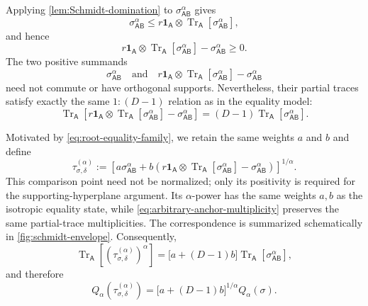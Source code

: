 \documentclass[11pt,reqno]{amsart}
\theoremstyle{definition}
\DeclareMathOperator{\Tr}{Tr}
\newcommand{\I}{\mathbf 1}
\newcommand{\A}{\mathsf{A}}
\newcommand{\B}{\mathsf{B}}
\begin{document}
Applying \cref{lem:Schmidt-domination} to
$\sigma_{\A\B}^{\alpha}$ gives
\begin{equation}\label{eq:root-envelope-explicit}
	\sigma_{\A\B}^{\alpha}
	\leq
	r\I_{\A}\otimes
	\Tr_{\A}[\sigma_{\A\B}^{\alpha}],
\end{equation}
and hence
\begin{equation}\label{eq:root-complement-explicit}
	r\I_{\A}\otimes
	\Tr_{\A}[\sigma_{\A\B}^{\alpha}]
	-
	\sigma_{\A\B}^{\alpha}
	\geq0.
\end{equation}
The two positive summands
\[
\sigma_{\A\B}^{\alpha}
\quad\text{and}\quad
r\I_{\A}\otimes
\Tr_{\A}[\sigma_{\A\B}^{\alpha}]
-
\sigma_{\A\B}^{\alpha}
\]
need not commute or have orthogonal supports.  Nevertheless, their partial
traces satisfy exactly the same $1:(D-1)$ relation as in the equality
model:
\begin{equation}\label{eq:arbitrary-anchor-multiplicity}
	\Tr_{\A}\!\left[
	r\I_{\A}\otimes
	\Tr_{\A}[\sigma_{\A\B}^{\alpha}]
	-
	\sigma_{\A\B}^{\alpha}
	\right]
	=
	(D-1)\Tr_{\A}[\sigma_{\A\B}^{\alpha}].
\end{equation}


Motivated by \cref{eq:root-equality-family}, we retain the same weights
$a$ and $b$ and define
\begin{equation}\label{eq:comparison-point-explicit}
	\boxed{
		\tau_{\sigma,\delta}^{(\alpha)}
		:=
		\left[
		a\sigma_{\A\B}^{\alpha}
		+b\left(
		r\I_{\A}\otimes
		\Tr_{\A}[\sigma_{\A\B}^{\alpha}]
		-
		\sigma_{\A\B}^{\alpha}
		\right)
		\right]^{1/\alpha}.}
\end{equation}
This comparison point need not be normalized; only its positivity is
required for the supporting-hyperplane argument.  Its $\alpha$-power has
the same weights $a,b$ as the isotropic equality state, while
\cref{eq:arbitrary-anchor-multiplicity} preserves the same partial-trace
multiplicities.  
The correspondence is summarized schematically in
\cref{fig:schmidt-envelope}.
Consequently,
\begin{equation}\label{eq:comparison-partial-trace}
	\Tr_{\A}\!\left[
	(\tau_{\sigma,\delta}^{(\alpha)})^\alpha
	\right]
	=
	\bigl[a+(D-1)b\bigr]
	\Tr_{\A}[\sigma_{\A\B}^{\alpha}],
\end{equation}
and therefore
\begin{equation}\label{eq:comparison-target-ratio}
	Q_\alpha(\tau_{\sigma,\delta}^{(\alpha)})
	=
	\bigl[a+(D-1)b\bigr]^{1/\alpha}
	Q_\alpha(\sigma).
\end{equation}
\end{document}
